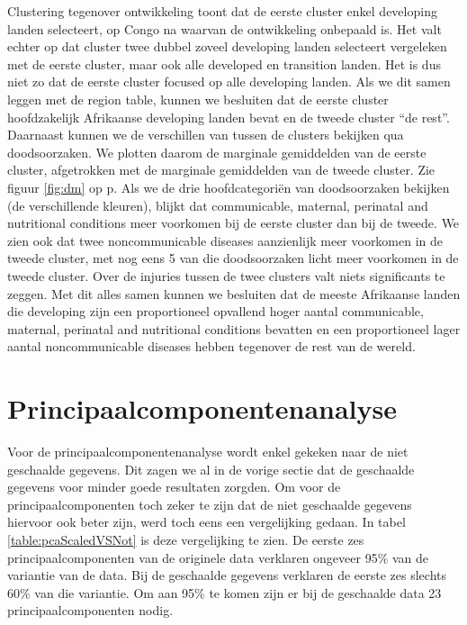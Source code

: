 \documentclass[a4paper,kulak]{kulakarticle}
\begin{document}
Clustering tegenover ontwikkeling toont dat de eerste cluster enkel developing landen selecteert, op Congo na waarvan de ontwikkeling onbepaald is.
Het valt echter op dat cluster twee dubbel zoveel developing landen selecteert vergeleken met de eerste cluster, maar ook alle developed en transition landen.
Het is dus niet zo dat de eerste cluster focused op alle developing landen.
Als we dit samen leggen met de region table, kunnen we besluiten dat de eerste cluster hoofdzakelijk Afrikaanse developing landen bevat en de tweede cluster ``de rest''. \newline
Daarnaast kunnen we de verschillen van tussen de clusters bekijken qua doodsoorzaken.
We plotten daarom de marginale gemiddelden van de eerste cluster, afgetrokken met de marginale gemiddelden van de tweede cluster.
Zie figuur \ref{fig:dm} op p\pageref{fig:dm}.
Als we de drie hoofdcategoriën van doodsoorzaken bekijken (de verschillende kleuren), blijkt dat communicable, maternal, perinatal and nutritional conditions meer voorkomen bij de eerste cluster dan bij de tweede.
We zien ook dat twee noncommunicable diseases aanzienlijk meer voorkomen in de tweede cluster, met nog eens 5 van die doodsoorzaken licht meer voorkomen in de tweede cluster.
Over de injuries tussen de twee clusters valt niets significants te zeggen. \newline
Met dit alles samen kunnen we besluiten dat de meeste Afrikaanse landen die developing zijn een proportioneel opvallend hoger aantal  communicable, maternal, perinatal and nutritional conditions bevatten en een proportioneel lager aantal noncommunicable diseases hebben tegenover de rest van de wereld.


\section{Principaalcomponentenanalyse}
Voor de principaalcomponentenanalyse wordt enkel gekeken naar de niet geschaalde gegevens. Dit zagen we al in de vorige sectie dat de geschaalde gegevens voor minder goede resultaten zorgden. Om voor de principaalcomponenten toch zeker te zijn dat de niet geschaalde gegevens hiervoor ook beter zijn, werd toch eens een vergelijking gedaan. In tabel \ref{table:pcaScaledVSNot} is deze vergelijking te zien. De eerste zes principaalcomponenten van de originele data verklaren ongeveer 95\% van de variantie van de data. Bij de geschaalde gegevens verklaren de eerste zes slechts 60\% van die variantie. Om aan 95\% te komen zijn er bij de geschaalde data 23 principaalcomponenten nodig. 
\end{document}
